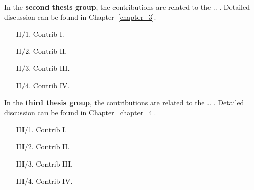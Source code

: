 \noindent
In the \textbf{second thesis group}, the contributions are related to the .. . Detailed discussion can be found in Chapter~\ref{chapter_3}.

\begin{enumerate}[wide = 0pt, widest = {II/5.}, leftmargin =*]
    \item[II/1.] Contrib I.
    
    \item[II/2.] Contrib II.
    
    \item[II/3.] Contrib III.
    
    \item[II/4.] Contrib IV.
\end{enumerate}

\vfill
\pagebreak

\noindent
In the \textbf{third thesis group}, the contributions are related to the .. . Detailed discussion can be found in Chapter~\ref{chapter_4}.

\begin{enumerate}[wide = 0pt, widest = {III/5.}, leftmargin =*]
    \item[III/1.] Contrib I.
    
    \item[III/2.] Contrib II.
    
    \item[III/3.] Contrib III.
    
    \item[III/4.] Contrib IV.
\end{enumerate}